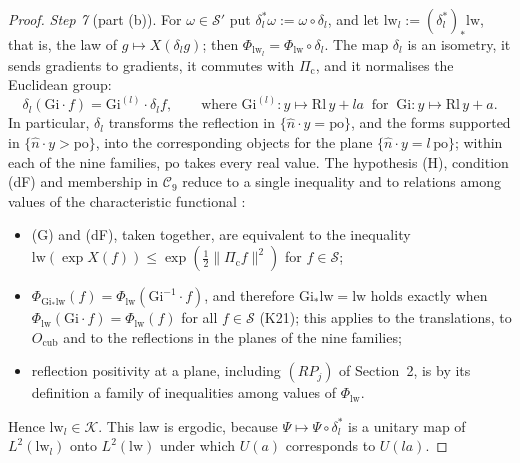 \documentclass[11pt,letterpaper,reqno]{amsart}
\theoremstyle{definition}
\begin{document}
\begin{proof}
\emph{Step 7} (part (b)).
For $\omega\in\mathcal S'$ put $\delta_l^*\omega:=\omega\circ\delta_l$, and let $\mathrm{lw}_l:=(\delta_l^*)_*\mathrm{lw}$, that is, the law of $g\mapsto X(\delta_lg)$; then $\Phi_{\mathrm{lw}_l}=\Phi_{\mathrm{lw}}\circ\delta_l$.
The map $\delta_l$ is an isometry, it sends gradients to gradients, it commutes with $\Pi_{\mathrm c}$, and it normalises the Euclidean group:
\begin{equation*}
\delta_l(\mathrm{Gi}\cdot f)=\mathrm{Gi}^{(l)}\cdot\delta_lf,\qquad\text{where }\mathrm{Gi}^{(l)}\colon y\mapsto\mathrm{Rl}\,y+la\ \text{ for }\ \mathrm{Gi}\colon y\mapsto\mathrm{Rl}\,y+a.
\end{equation*}
In particular, $\delta_l$ transforms the reflection in $\{\hat n\cdot y=\mathrm{po}\}$, and the forms supported in $\{\hat n\cdot y>\mathrm{po}\}$, into the corresponding objects for the plane $\{\hat n\cdot y=l\,\mathrm{po}\}$; within each of the nine families, $\mathrm{po}$ takes every real value.
The hypothesis (H), condition (dF) and membership in $\mathcal C_9$ reduce to a single inequality and to relations among values of the characteristic functional \cite[Section~1.2, Definition~2.38, Remark~14.4]{QEDII}:
\begin{itemize}
\item[(i)] (G) and (dF), taken together, are equivalent to the inequality $\mathrm{lw}(\exp X(f))\le\exp(\frac12\|\Pi_{\mathrm c}f\|^2)$ for $f\in\mathcal S$;
\item[(ii)] $\Phi_{\mathrm{Gi}_*\mathrm{lw}}(f)=\allowbreak \Phi_{\mathrm{lw}}(\mathrm{Gi}^{-1}\cdot f)$, and therefore $\mathrm{Gi}_*\mathrm{lw}=\mathrm{lw}$ holds exactly when $\Phi_{\mathrm{lw}}(\mathrm{Gi}\cdot f)=\Phi_{\mathrm{lw}}(f)$ for all $f\in\mathcal S$ (K21); this applies to the translations, to $O_{\mathrm{cub}}$ and to the reflections in the planes of the nine families;
\item[(iii)] reflection positivity at a plane, including $(RP_j)$ of Section~2, is by its definition a family of inequalities among values of $\Phi_{\mathrm{lw}}$.
\end{itemize}
Hence $\mathrm{lw}_l\in\mathcal K$.
This law is ergodic, because $\Psi\mapsto\Psi\circ\delta_l^*$ is a unitary map of $L^2(\mathrm{lw}_l)$ onto $L^2(\mathrm{lw})$ under which $U(a)$ corresponds to $U(la)$.


\end{proof}
\end{document}

